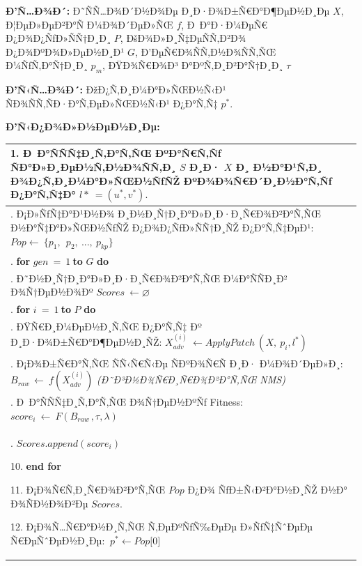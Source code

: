 \documentclass[]{article}
\newcounter{none} %
\begin{document}
\textbf{Ð’Ñ…Ð¾Ð´:} Ð˜ÑÑ…Ð¾Ð´Ð½Ð¾Ðµ Ð¸Ð·Ð¾Ð±Ñ€Ð°Ð¶ÐµÐ½Ð¸Ðµ \(X\), Ð¦ÐµÐ»ÐµÐ²Ð°Ñ Ð¼Ð¾Ð´ÐµÐ»ÑŒ \(f\), Ð Ð°Ð·Ð¼ÐµÑ€ Ð¿Ð¾Ð¿ÑƒÐ»ÑÑ†Ð¸Ð¸ \(P\), ÐšÐ¾Ð»Ð¸Ñ‡ÐµÑÑ‚Ð²Ð¾ Ð¿Ð¾ÐºÐ¾Ð»ÐµÐ½Ð¸Ð¹ \(G\), Ð’ÐµÑ€Ð¾ÑÑ‚Ð½Ð¾ÑÑ‚ÑŒ Ð¼ÑƒÑ‚Ð°Ñ†Ð¸Ð¸ \(p_{m}\), ÐŸÐ¾Ñ€Ð¾Ð³ Ð°ÐºÑ‚Ð¸Ð²Ð°Ñ†Ð¸Ð¸ \(\tau\)

\textbf{Ð’Ñ‹Ñ…Ð¾Ð´:} ÐžÐ¿Ñ‚Ð¸Ð¼Ð°Ð»ÑŒÐ½Ñ‹Ð¹ ÑÐ¾ÑÑ‚ÑÐ·Ð°Ñ‚ÐµÐ»ÑŒÐ½Ñ‹Ð¹ Ð¿Ð°Ñ‚Ñ‡ \(p^{*}\).

\textbf{Ð’Ñ‹Ð¿Ð¾Ð»Ð½ÐµÐ½Ð¸Ðµ:}

{\def\LTcaptype{none} %
\begin{longtable}[]{@{}
  >{\raggedright\arraybackslash}p{}@{}}
\toprule\noalign{}
\begin{minipage}[b]{\linewidth}\raggedright
1. Ð Ð°ÑÑÑ‡Ð¸Ñ‚Ð°Ñ‚ÑŒ ÐºÐ°Ñ€Ñ‚Ñƒ ÑÐ°Ð»Ð¸ÐµÐ½Ñ‚Ð½Ð¾ÑÑ‚Ð¸ \(S\) Ð¸Ð· \(X\) Ð¸ Ð½Ð°Ð¹Ñ‚Ð¸ Ð¾Ð¿Ñ‚Ð¸Ð¼Ð°Ð»ÑŒÐ½ÑƒÑŽ ÐºÐ¾Ð¾Ñ€Ð´Ð¸Ð½Ð°Ñ‚Ñƒ Ð¿Ð°Ñ‚Ñ‡Ð° \(l*\  = (u^{*},v^{*}).\)
\end{minipage} \\
\midrule\noalign{}
\endhead
\bottomrule\noalign{}
\endlastfoot
2. Ð¡Ð»ÑƒÑ‡Ð°Ð¹Ð½Ð¾ Ð¸Ð½Ð¸Ñ†Ð¸Ð°Ð»Ð¸Ð·Ð¸Ñ€Ð¾Ð²Ð°Ñ‚ÑŒ Ð½Ð°Ñ‡Ð°Ð»ÑŒÐ½ÑƒÑŽ Ð¿Ð¾Ð¿ÑƒÐ»ÑÑ†Ð¸ÑŽ Ð¿Ð°Ñ‚Ñ‡ÐµÐ¹:\(Pop \leftarrow \ \{ p_{1},\ \ p_{2},\ ...,\ p_{kp}\}\) \\
3. \textbf{for} \(gen\  = \ 1\ \)\textbf{to} \(G\) \textbf{do} \\
4.  Ð˜Ð½Ð¸Ñ†Ð¸Ð°Ð»Ð¸Ð·Ð¸Ñ€Ð¾Ð²Ð°Ñ‚ÑŒ Ð¼Ð°ÑÑÐ¸Ð² Ð¾Ñ†ÐµÐ½Ð¾Ðº \(Scores\  \leftarrow \varnothing\) \\
5.  \textbf{for} \(i\  = \ 1\ \)\textbf{to} \(P\) \textbf{do} \\
6.  ÐŸÑ€Ð¸Ð¼ÐµÐ½Ð¸Ñ‚ÑŒ Ð¿Ð°Ñ‚Ñ‡ Ðº Ð¸Ð·Ð¾Ð±Ñ€Ð°Ð¶ÐµÐ½Ð¸ÑŽ: \(X_{adv}^{(i)}\  \leftarrow ApplyPatch\ (X,\ p_{i},l^{*})\) \\
7.  Ð¡Ð¾Ð±Ñ€Ð°Ñ‚ÑŒ ÑÑ‹Ñ€Ñ‹Ðµ ÑÐºÐ¾Ñ€Ñ Ð¸Ð· Ð¼Ð¾Ð´ÐµÐ»Ð¸: \(B_{raw\ } \leftarrow \ f(X_{adv}^{(i)})\) \emph{(Ð˜Ð³Ð½Ð¾Ñ€Ð¸Ñ€Ð¾Ð²Ð°Ñ‚ÑŒ NMS)} \\
8.  Ð Ð°ÑÑÑ‡Ð¸Ñ‚Ð°Ñ‚ÑŒ Ð¾Ñ†ÐµÐ½ÐºÑƒ Fitness: \({score}_{i}\  \leftarrow \ F(B_{raw\ },\tau,\lambda)\) \\
9.  \(Scores.append({score}_{i})\)

10. \textbf{end for}

11. Ð¡Ð¾Ñ€Ñ‚Ð¸Ñ€Ð¾Ð²Ð°Ñ‚ÑŒ \(Pop\) Ð¿Ð¾ ÑƒÐ±Ñ‹Ð²Ð°Ð½Ð¸ÑŽ Ð½Ð° Ð¾ÑÐ½Ð¾Ð²Ðµ \(Scores\).

12. Ð¡Ð¾Ñ…Ñ€Ð°Ð½Ð¸Ñ‚ÑŒ Ñ‚ÐµÐºÑƒÑ‰ÐµÐµ Ð»ÑƒÑ‡ÑˆÐµÐµ Ñ€ÐµÑˆÐµÐ½Ð¸Ðµ: \(\ p^{*} \leftarrow Pop\lbrack 0\rbrack\)


\end{longtable}}
\end{document}
